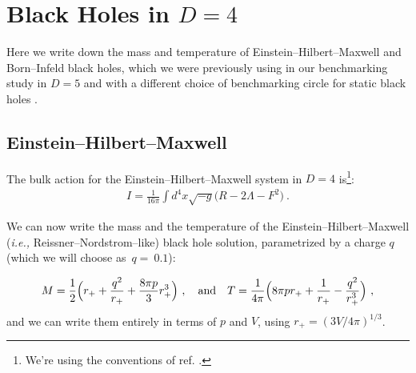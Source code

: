 \documentclass[letterpaper,11pt]{article}
\newcommand{\bea}{\begin{eqnarray}}
\newcommand{\eea}{\end{eqnarray}}
\begin{document}

\appendix

\section{Black Holes in $D=4$}
\label{BHs}

Here we write down the mass and temperature of Einstein--Hilbert--Maxwell and Born--Infeld black holes, which we were previously using in our benchmarking study  in $D=5$  and with a different choice of benchmarking circle for static black holes  \cite{Chakraborty:2016ssb}. 

\subsection{Einstein--Hilbert--Maxwell}
\label{EHM}


The bulk action for the Einstein--Hilbert--Maxwell system in $D=4$  is\footnote{We're using the conventions of ref. \cite{Chamblin:1999tk}.}:
\bea \label{EHMaction}
I=\frac{1}{16\pi}\int d^4 x\sqrt{-g}\Big(R-2\Lambda -F^2\Big) \ .
\eea 

We can now write the mass and the temperature of the Einstein--Hilbert--Maxwell ({\it i.e., } Reissner--Nordstrom--like) black hole solution, parametrized by a charge $q$ (which we will  choose  as~$q=~0.1$):

\bea
M=\frac{1}{2}\Big(r_{+}+\frac{q^2}{r_{+}}+\frac{8 \pi p}{3}r^3_{+}\Big)\ ,\quad {\rm and} \quad
T=\frac{1}{4\pi}\Big(8 \pi p r_{+}+\frac{1}{r_{+}}-\frac{q^2}{r^3_{+}}\Big)\ , 
\eea
 and we can write them entirely in terms of $p$ and $V$, using  $r_{+}=(3V/4\pi)^{1/3}$. 


\end{document}
